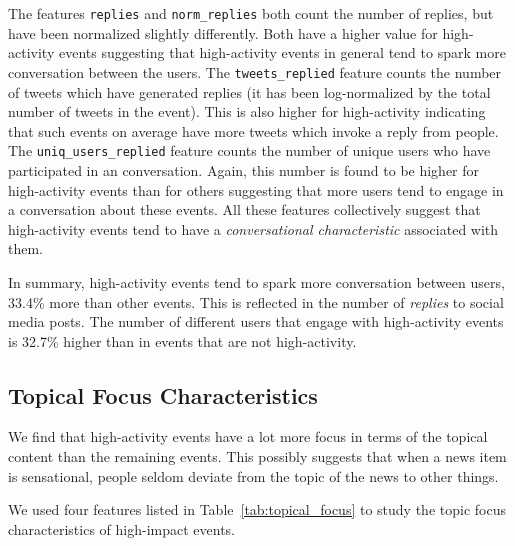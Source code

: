 The features \texttt{replies} and \texttt{norm\_replies} both count the number
of replies, but have been normalized slightly differently. 
%
Both have a higher value for high-activity events suggesting that high-activity
events in general tend to spark more conversation between the users. 
%
The \texttt{tweets\_replied} feature counts the number of tweets which have
generated replies (it has been log-normalized by the total number of tweets in
the event). 
%
This is also higher for high-activity indicating that such events on average
have more tweets which invoke a reply from people. 
%
The \texttt{uniq\_users\_replied} feature counts the number of unique users who
have participated in an conversation. 
%
Again, this number is found to be higher for high-activity events than for
others suggesting that more users tend to engage in a conversation about these
events. 
%
All these features collectively suggest that high-activity events tend to have a
\emph{conversational characteristic} associated with them.


In summary, high-activity events tend to spark more conversation between users,
33.4\% more than other events. 
%
This is reflected in the number of {\em replies} to social media posts. 
%
The number of different users that engage with high-activity events is 32.7\%
higher than in events that are not high-activity. 



\subsection{Topical Focus Characteristics}
\label{subsec:topical_focus}


We find that high-activity events have a lot more focus in terms of the topical
content than the remaining events. 
%
This possibly suggests that when a news item is sensational, people seldom
deviate from the topic of the news to other things. 

We used four features listed in Table~\ref{tab:topical_focus} to study the topic
focus characteristics of high-impact events.

